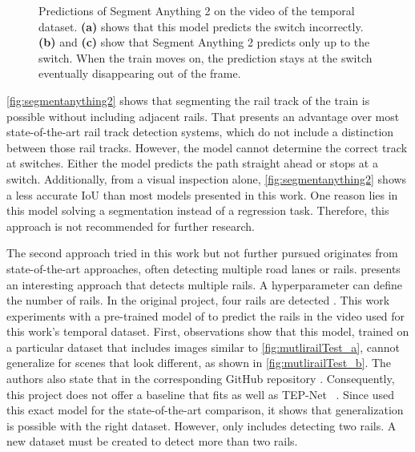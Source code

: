 \begin{figure}[H]
\begin{subfigure}{0.328\textwidth}
        \caption{}
        \label{fig:segmentanything2_c}
    \end{subfigure}
    \caption{Predictions of Segment Anything 2 \cite{segmentAnything22024} on the video of the temporal dataset. \textbf{(a)} shows that this model predicts the switch incorrectly. \textbf{(b)} and \textbf{(c)} show that Segment Anything 2 predicts only up to the switch. When the train moves on, the prediction stays at the switch eventually disappearing out of the frame.}
    \label{fig:segmentanything2}
\end{figure}

\clearpage

\noindent\autoref{fig:segmentanything2} shows that segmenting the rail track of the train is possible without including adjacent rails.
That presents an advantage over most state-of-the-art rail track detection systems, which do not include a distinction between those rail tracks.
However, the model cannot determine the correct track at switches.
Either the model predicts the path straight ahead or stops at a switch.
Additionally, from a visual inspection alone, \autoref{fig:segmentanything2} shows a less accurate \ac{IoU} than most models presented in this work.
One reason lies in this model solving a segmentation instead of a regression task.
Therefore, this approach is not recommended for further research.

The second approach tried in this work but not further pursued originates from state-of-the-art approaches, often detecting multiple road lanes or rails.
\cite{li2022rail} presents an interesting approach that detects multiple rails.
A hyperparameter can define the number of rails.
In the original project, four rails are detected \cite{railNet2022GitHub}.
This work experiments with a pre-trained model of \cite{li2022rail} to predict the rails in the video used for this work's temporal dataset.
First, observations show that this model, trained on a particular dataset that includes images similar to \autoref{fig:mutlirailTest_a}, cannot generalize for scenes that look different, as shown in \autoref{fig:mutlirailTest_b}.
The authors also state that in the corresponding GitHub repository \cite{railNet2022GitHub}.
Consequently, this project does not offer a baseline that fits as well as TEP-Net ~\cite{tepNet2024}.
Since \cite{tepNet2024} used this exact model \cite{li2022rail} for the state-of-the-art comparison, it shows that generalization is possible with the right dataset.
However, \cite{tepNet2024} only includes detecting two rails.
A new dataset must be created to detect more than two rails.

